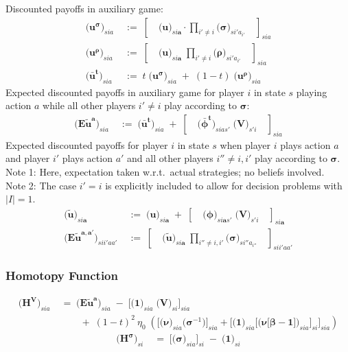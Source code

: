 \documentclass[11pt,fleqn]{article}
\newcommand{\bsigma}{\bm{\sigma}}
\newcommand{\bbeta}{\bm{\beta}}
\newcommand{\brho}{\bm{\rho}}
\newcommand{\bV}{\bm{V}}
\newcommand{\bnu}{\bm{\nu}}
\newcommand{\bone}{\bm{1}}
\newcommand{\ba}{\bm{a}}
\newcommand{\tu}{\tilde{u}}
\begin{document}
Discounted payoffs in auxiliary game:
\begin{align*}
	\biggl( \bm{u^{\sigma}} \biggr)_{sia} & \;:=\; \left[ \quad \biggl( \bm{u} \biggr)_{si\ba} \cdot \prod\limits_{i'\neq i} \biggl( \bsigma \biggr)_{si'a_{i'}} \quad \right]_{sia} \\
	\biggl( \bm{u^{\rho}} \biggr)_{sia} & \;:=\; \left[ \quad \biggl( \bm{u} \biggr)_{si\ba} \; \prod\limits_{i'\neq i} \biggl( \brho \biggr)_{si'a_{i'}} \quad \right]_{sia} \\
	\biggl( \bm{{\bar{u}^t}} \biggr)_{sia} & \;:=\; t \; \biggl( \bm{u^{\sigma}} \biggr)_{sia} \;+\; (1-t) \; \biggl( \bm{u^{\rho}} \biggr)_{sia}
\end{align*}
Expected discounted payoffs in auxiliary game for player $i$ in state $s$ playing action $a$ while all other players $i'\neq i$ play according to $\bsigma$:
\begin{align*}
	\biggl( \bm{{E\tu^{a}}} \biggr)_{sia} & \;:=\; \biggl( \bm{{\bar{u}^t}} \biggr)_{sia} \;+\; \left[ \quad \biggl( \bm{{\bar{\phi}^t}} \biggr)_{sias'} \; \biggl( \bV \biggr)_{s'i} \quad \right]_{sia}
\end{align*}
Expected discounted payoffs for player $i$ in state $s$ when player $i$ plays action $a$ and player $i'$ plays action $a'$ and all other players $i'' \neq i, i'$ play according to $\bsigma$. \\
Note 1: Here, expectation taken w.r.t.\ actual strategies; no beliefs involved. \\
Note 2: The case $i'=i$ is explicitly included to allow for decision problems with $|I|=1$.
\begin{align*}
	\biggl( \bm{{\tu}} \biggr)_{si\ba} & \;:=\; \biggl( \bm{u} \biggr)_{si\ba} \;+\; \left[ \quad \biggl( \bm{\phi} \biggr)_{si\ba s'} \; \biggl( \bV \biggr)_{s'i} \quad \right]_{si\ba} \\
	\biggl( \bm{{E\tu^{a,a'}}} \biggr)_{sii'aa'} & \;:=\; \left[ \quad \biggl( \bm{{\tu}} \biggr)_{si\ba} \; \prod\limits_{i''\neq i,i'} \biggl( \bsigma \biggr)_{si''a_{i''}} \quad \right]_{sii'aa'}
\end{align*} 


\subsubsection*{Homotopy Function}

\begin{align*}
	\biggl( \bm{H^{V}} \biggr)_{sia} & \;=\; 
	\biggl( \bm{{E\tu^{a}}} \biggr)_{sia} \;-\; \Biggl[ \biggl( \bone \biggr)_{sia} \; \biggl( \bV \biggr)_{si} \Biggr]_{sia} \\
	& \qquad \;+\; (1-t)^2 \: \eta_0 \; \left( \Biggl[ \biggl( \bnu \biggr)_{sia} \biggl( \bsigma^{-1} \biggr) \Biggr]_{sia} + \Biggl[ \biggl( \bone \biggr)_{sia} \Biggl[ \biggl( \bnu\bigl[\bbeta-\bone\bigr] \biggr)_{sia} \Biggr]_{si} \Biggr]_{sia} \right)
\end{align*}
\begin{align*}
	\biggl( \bm{H^{\sigma}} \biggr)_{si} & \;=\; 
	\Biggl[ \biggl( \bsigma \biggr)_{sia} \Biggr]_{si} \;-\; \biggl( \bone \biggr)_{si} 
\end{align*}
\end{document}
